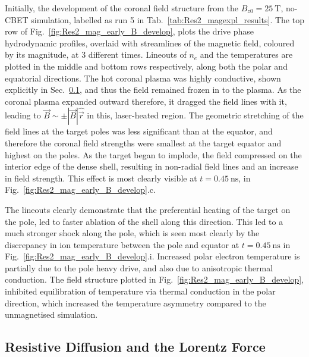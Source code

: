 Initially, the development of the coronal field structure from the $B_{z0}=25\ \text{T}$, no-\ac{CBET} simulation, labelled as run 5 in Tab.~\ref{tab:Res2_magexpl_results}.
The top row of Fig.~\ref{fig:Res2_mag_early_B_develop}, plots the drive phase hydrodynamic profiles, overlaid with streamlines of the magnetic field, coloured by its magnitude, at 3 different times.
Lineouts of $n_e$ and the temperatures are plotted in the middle and bottom rows respectively, along both the polar and equatorial directions.
The hot coronal plasma was highly conductive, shown explicitly in Sec.~\ref{sec:Res2_resis}, and thus the field remained frozen in to the plasma.
As the coronal plasma expanded outward therefore, it dragged the field lines with it, leading to $\vec{B}\sim\pm|\vec{B}|\hat{\vec{r}}$ in this, laser-heated region.
The geometric stretching of the field lines at the target poles was less significant than at the equator, and therefore the coronal field strengths were smallest at the target equator and highest on the poles.
As the target began to implode, the field compressed on the interior edge of the dense shell, resulting in non-radial field lines and an increase in field strength.
This effect is most clearly visible at $t=0.45\ \text{ns}$, in Fig.~\ref{fig:Res2_mag_early_B_develop}.c.

The lineouts clearly demonstrate that the preferential heating of the target on the pole, led to faster ablation of the shell along this direction.
This led to a much stronger shock along the pole, which is seen most clearly by the discrepancy in ion temperature between the pole and equator at $t=0.45\ \text{ns}$ in Fig.~\ref{fig:Res2_mag_early_B_develop}.i.
Increased polar electron temperature is partially due to the pole heavy drive, and also due to anisotropic thermal conduction.
The field structure plotted in Fig.~\ref{fig:Res2_mag_early_B_develop}, inhibited equilibration of temperature via thermal conduction in the polar direction, which increased the temperature asymmetry compared to the unmagnetised simulation.



\subsection{Resistive Diffusion and the Lorentz Force}%
\label{sec:Res2_resis}

